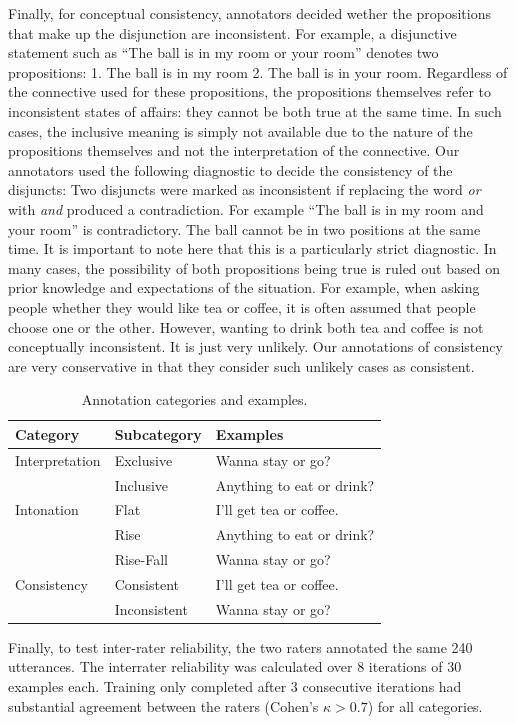 \documentclass[10pt, letterpaper]{article}
\begin{document}
Finally, for conceptual consistency, annotators decided wether the
propositions that make up the disjunction are inconsistent. For example,
a disjunctive statement such as ``The ball is in my room or your room''
denotes two propositions: 1. The ball is in my room 2. The ball is in
your room. Regardless of the connective used for these propositions, the
propositions themselves refer to inconsistent states of affairs: they
cannot be both true at the same time. In such cases, the inclusive
meaning is simply not available due to the nature of the propositions
themselves and not the interpretation of the connective. Our annotators
used the following diagnostic to decide the consistency of the
disjuncts: Two disjuncts were marked as inconsistent if replacing the
word \emph{or} with \emph{and} produced a contradiction. For example
``The ball is in my room and your room'' is contradictory. The ball
cannot be in two positions at the same time. It is important to note
here that this is a particularly strict diagnostic. In many cases, the
possibility of both propositions being true is ruled out based on prior
knowledge and expectations of the situation. For example, when asking
people whether they would like tea or coffee, it is often assumed that
people choose one or the other. However, wanting to drink both tea and
coffee is not conceptually inconsistent. It is just very unlikely. Our
annotations of consistency are very conservative in that they consider
such unlikely cases as consistent.

\begin{table}[H]
\centering
\begin{tabular}{lll}
 Category & Subcategory & Examples \\ 
  \hline
Interpretation & Exclusive & Wanna stay or go? \\ 
   & Inclusive & Anything to eat or drink? \\ 
   \hline
Intonation & Flat & I'll get tea or coffee. \\ 
   & Rise & Anything to eat or drink? \\ 
   & Rise-Fall & Wanna stay or go? \\ 
   \hline
Consistency & Consistent & I'll get tea or coffee. \\ 
   & Inconsistent & Wanna stay or go? \\ 
  \end{tabular}
\caption{Annotation categories and examples.} 
\end{table}

Finally, to test inter-rater reliability, the two raters annotated the
same 240 utterances. The interrater reliability was calculated over 8
iterations of 30 examples each. Training only completed after 3
consecutive iterations had substantial agreement between the raters
(Cohen's \(\kappa > 0.7\)) for all categories.
\end{document}

